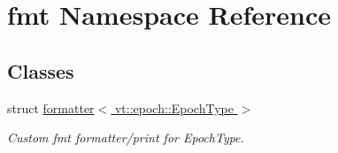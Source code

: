 \hypertarget{namespacefmt}{}\section{fmt Namespace Reference}
\label{namespacefmt}
\subsection*{Classes}
\begin{DoxyCompactItemize}
\item 
struct \hyperlink{structfmt_1_1formatter_3_01vt_1_1epoch_1_1_epoch_type_01_4}{formatter$<$ vt\+::epoch\+::\+Epoch\+Type $>$}
\begin{DoxyCompactList}\small\item\em Custom fmt formatter/print for {\ttfamily Epoch\+Type}. \end{DoxyCompactList}\end{DoxyCompactItemize}
